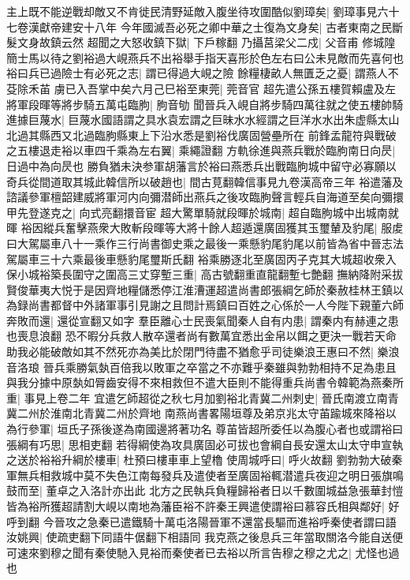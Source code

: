 主上既不能逆戰却敵又不肯徙民清野延敵入腹坐待攻圍酷似劉璋矣|{
	劉璋事見六十七卷漢獻帝建安十八年}
今年國滅吾必死之卿中華之士復為文身矣|{
	古者東南之民斷髮文身故鎮云然}
超聞之大怒收鎮下獄|{
	下戶稼翻}
乃攝莒梁父二戍|{
	父音甫}
修城隍簡士馬以待之劉裕過大峴燕兵不出裕舉手指天喜形於色左右曰公未見敵而先喜何也裕曰兵已過險士有必死之志|{
	謂已得過大峴之險}
餘糧棲畝人無匱乏之憂|{
	謂燕人不芟除禾苖}
虜已入吾掌中矣六月己巳裕至東莞|{
	莞音官}
超先遣公孫五樓賀賴盧及左將軍段暉等將步騎五萬屯臨朐|{
	朐音劬}
聞晉兵入峴自將步騎四萬往就之使五樓帥騎進據巨蔑水|{
	巨蔑水國語謂之具水袁宏謂之巨昧水水經謂之巨洋水水出朱虚縣太山北過其縣西又北過臨朐縣東上下沿水悉是劉裕伐廣固營壘所在}
前鋒孟龍符與戰破之五樓退走裕以車四千乘為左右翼|{
	乘繩證翻}
方軌徐進與燕兵戰於臨朐南日向昃|{
	日過中為向昃也}
勝負猶未決参軍胡藩言於裕曰燕悉兵出戰臨朐城中留守必寡願以奇兵從間道取其城此韓信所以破趙也|{
	間古莧翻韓信事見九卷漢高帝三年}
裕遣藩及諮議參軍檀韶建威將軍河内向彌潜師出燕兵之後攻臨朐聲言輕兵自海道至矣向彌擐甲先登遂克之|{
	向式亮翻擐音宦}
超大驚單騎就段暉於城南|{
	超自臨胊城中出城南就暉}
裕因縱兵奮擊燕衆大敗斬段暉等大將十餘人超遁還廣固獲其玉璽輦及豹尾|{
	服䖍曰大駕屬車八十一乘作三行尚書御史乘之最後一乘懸豹尾豹尾以前皆為省中晉志法駕屬車三十六乘最後車懸豹尾璽斯氏翻}
裕乘勝逐北至廣固丙子克其大城超收衆入保小城裕築長圍守之圍高三丈穿塹三重|{
	高古號翻重直龍翻塹七艶翻}
撫納降附采拔賢俊華夷大悦于是因齊地糧儲悉停江淮漕運超遣尚書郎張綱乞師於秦赦桂林王鎮以為録尚書都督中外諸軍事引見謝之且問計焉鎮曰百姓之心係於一人今陛下親董六師奔敗而還|{
	還從宣翻又如字}
羣臣離心士民喪氣聞秦人自有内患|{
	謂秦内有赫連之患也喪息浪翻}
恐不暇分兵救人散卒還者尚有數萬宜悉出金帛以餌之更決一戰若天命助我必能破敵如其不然死亦為美比於閉門待盡不猶愈乎司徒樂浪王惠曰不然|{
	樂浪音洛琅}
晉兵乘勝氣埶百倍我以敗軍之卒當之不亦難乎秦雖與勃勃相持不足為患且與我分據中原埶如脣齒安得不來相救但不遣大臣則不能得重兵尚書令韓範為燕秦所重|{
	事見上卷二年}
宜遣乞師超從之秋七月加劉裕北青冀二州刺史|{
	晉氏南渡立南青冀二州於淮南北青冀二州於齊地}
南燕尚書畧陽垣尊及弟京兆太守苖踰城來降裕以為行參軍|{
	垣氏子孫後遂為南國邊將著功名}
尊苖皆超所委任以為腹心者也或謂裕曰張綱有巧思|{
	思相吏翻}
若得綱使為攻具廣固必可拔也會綱自長安還太山太守申宣執之送於裕裕升綱於樓車|{
	杜預曰樓車車上望櫓}
使周城呼曰|{
	呼火故翻}
劉勃勃大破秦軍無兵相救城中莫不失色江南每發兵及遣使者至廣固裕輒潜遣兵夜迎之明日張旗鳴鼓而至|{
	董卓之入洛計亦出此}
北方之民執兵負糧歸裕者日以千數圍城益急張華封愷皆為裕所獲超請割大峴以南地為藩臣裕不許秦王興遣使謂裕曰慕容氏相與鄰好|{
	好呼到翻}
今晉攻之急秦已遣鐵騎十萬屯洛陽晉軍不還當長驅而進裕呼秦使者謂曰語汝姚興|{
	使疏吏翻下同語牛倨翻下相語同}
我克燕之後息兵三年當取關洛今能自送便可速來劉穆之聞有秦使馳入見裕而秦使者已去裕以所言告穆之穆之尤之|{
	尤怪也過也}
